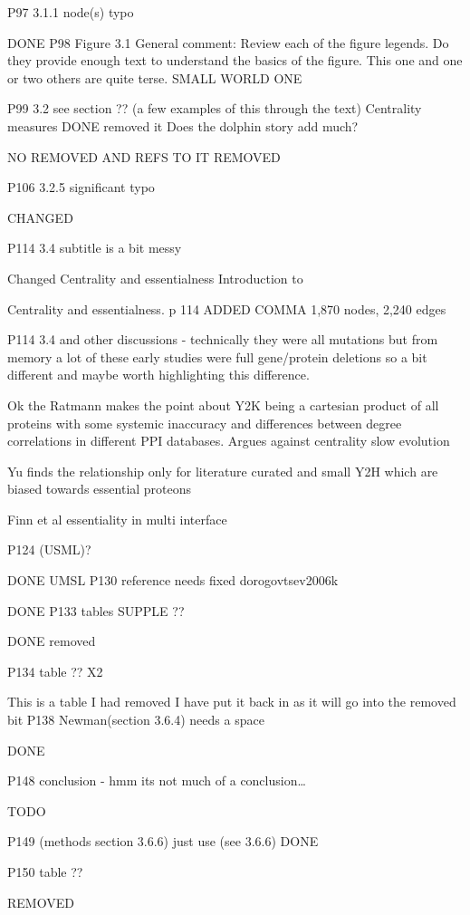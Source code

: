 P97 3.1.1 node(s) typo

DONE
P98 Figure 3.1 General comment: Review each of the figure legends. Do they provide enough text to understand the basics of the figure. This one and one or two others are quite terse. SMALL WORLD ONE

P99 3.2 see section ??  (a few examples of this through the text) Centrality measures
DONE removed it
Does the dolphin story add much?

NO
REMOVED AND REFS TO IT REMOVED

P106 3.2.5 significant typo

CHANGED

P114 3.4 subtitle is a bit messy

Changed Centrality and essentialness Introduction to 

Centrality and essentialness.
p 114 ADDED COMMA 1,870 nodes, 2,240 edges

P114 3.4 and other discussions - technically they were all mutations but from memory a lot of these early studies were full gene/protein deletions so a bit different and maybe worth highlighting this difference.

Ok the Ratmann makes the point about Y2K being a cartesian product of all proteins with some systemic inaccuracy and differences between degree correlations in different PPI databases. 
Argues against centrality slow evolution 

Yu finds the relationship only for literature curated and small Y2H which are biased towards essential proteons

Finn et al essentiality in multi interface 


P124 (USML)?

DONE  UMSL
P130 reference needs fixed dorogovtsev2006k


DONE
P133 tables SUPPLE ??

DONE removed

P134 table ?? X2

This is a table I had removed I have put it back in as it will go into the removed bit
P138 Newman(section 3.6.4) needs a space

DONE

P148 conclusion - hmm its not much of a conclusion…

TODO

P149 (methods section 3.6.6) just use (see 3.6.6)
DONE

P150 table ??

REMOVED

